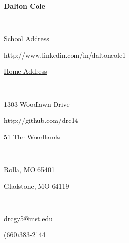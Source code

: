 \documentclass{article}
\newcommand\textbox[1]{%
  \parbox{.333\textwidth}{#1}%
}
\begin{document}

\noindent\textbox{\hfill}\textbox{\hfil \textbf{Dalton Cole}\hfil}\textbox{\hfill} \\
\noindent\textbox{\underline{School Address}\hfill}\textbox{\hfil http://www.linkedin.com/in/daltoncole1\hfil}\textbox{\hfill \underline{Home Address}} \\
\noindent\textbox{1303 Woodlawn Drive\hfill}\textbox{\hfil http://github.com/drc14\hfil}\textbox{\hfill 51 The Woodlands} \\
\noindent\textbox{Rolla, MO 65401\hfill}\textbox{\hfil \hfil}\textbox{\hfill Gladstone, MO 64119} \\
\noindent\textbox{drcgy5@mst.edu\hfill}\textbox{\hfil \hfil}\textbox{\hfill (660)383-2144} \\
\noindent\makebox[\linewidth]{\rule{\textwidth}{.4pt}} 
\end{document}
